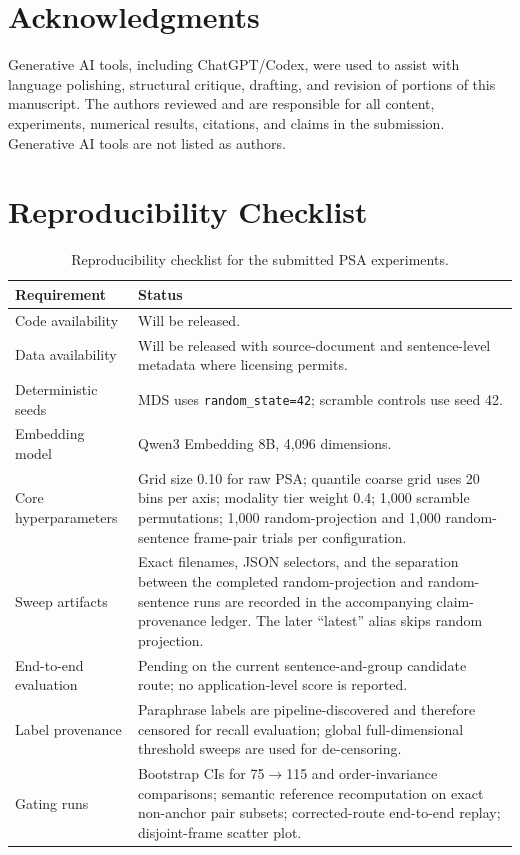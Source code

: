 \documentclass[11pt]{article}
\begin{document}
\section*{Acknowledgments}

Generative AI tools, including ChatGPT/Codex, were used to assist with language polishing, structural critique, drafting, and revision of portions of this manuscript. The authors reviewed and are responsible for all content, experiments, numerical results, citations, and claims in the submission. Generative AI tools are not listed as authors.



\clearpage
\onecolumn
\appendix

\section{Reproducibility Checklist}

\begin{table}[!ht]
\centering
\small
\begin{tabularx}{\textwidth}{@{}lY@{}}
\toprule
Requirement & Status \\
\midrule
Code availability & Will be released. \\
Data availability & Will be released with source-document and sentence-level metadata where licensing permits. \\
Deterministic seeds & MDS uses \texttt{random\_state=42}; scramble controls use seed 42. \\
Embedding model & Qwen3 Embedding 8B, 4,096 dimensions. \\
Core hyperparameters & Grid size 0.10 for raw PSA; quantile coarse grid uses 20 bins per axis; modality tier weight 0.4; 1,000 scramble permutations; 1,000 random-projection and 1,000 random-sentence frame-pair trials per configuration. \\
Sweep artifacts & Exact filenames, JSON selectors, and the separation between the completed random-projection and random-sentence runs are recorded in the accompanying claim-provenance ledger. The later ``latest'' alias skips random projection. \\
End-to-end evaluation & Pending on the current sentence-and-group candidate route; no application-level score is reported. \\
Label provenance & Paraphrase labels are pipeline-discovered and therefore censored for recall evaluation; global full-dimensional threshold sweeps are used for de-censoring. \\
Gating runs & Bootstrap CIs for 75$\rightarrow$115 and order-invariance comparisons; semantic reference recomputation on exact non-anchor pair subsets; corrected-route end-to-end replay; disjoint-frame scatter plot. \\
\bottomrule
\end{tabularx}
\caption{Reproducibility checklist for the submitted PSA experiments.}
\label{tab:checklist}
\end{table}
\end{document}

